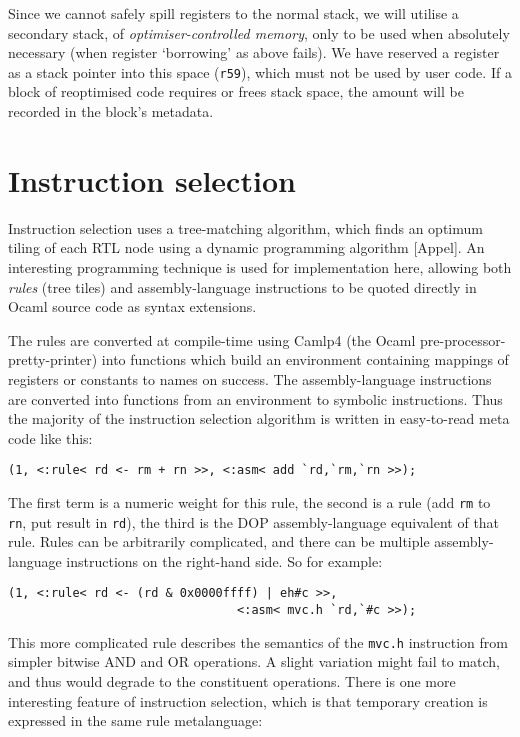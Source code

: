 Since we cannot safely spill registers to the normal stack, we will utilise a secondary stack, of \emph{optimiser-controlled memory}, only to be used when absolutely necessary (when register `borrowing' as above fails). We have reserved a register as a stack pointer into this space (\texttt{r59}), which must not be used by user code. If a block of reoptimised code requires or frees stack space, the amount will be recorded in the block's metadata.

\section{Instruction selection}

Instruction selection uses a tree-matching algorithm, which finds an optimum tiling of each RTL node using a dynamic programming algorithm [Appel]. An interesting programming technique is used for implementation here, allowing both \emph{rules} (tree tiles) and assembly-language instructions to be quoted directly in Ocaml source code as syntax extensions.

The rules are converted at compile-time using Camlp4 (the Ocaml pre-processor-pretty-printer) into functions which build an environment containing mappings of registers or constants to names on success. The assembly-language instructions are converted into functions from an environment to symbolic instructions. Thus the majority of the instruction selection algorithm is written in easy-to-read meta code like this:

\begin{verbatim}
(1, <:rule< rd <- rm + rn >>, <:asm< add `rd,`rm,`rn >>);
\end{verbatim}

The first term is a numeric weight for this rule, the second is a rule (add \texttt{rm} to \texttt{rn}, put result in \texttt{rd}), the third is the DOP assembly-language equivalent of that rule. Rules can be arbitrarily complicated, and there can be multiple assembly-language instructions on the right-hand side. So for example:

\begin{verbatim}
(1, <:rule< rd <- (rd & 0x0000ffff) | eh#c >>,
                                <:asm< mvc.h `rd,`#c >>);
\end{verbatim}

This more complicated rule describes the semantics of the \texttt{mvc.h} instruction from simpler bitwise AND and OR operations. A slight variation might fail to match, and thus would degrade to the constituent operations. There is one more interesting feature of instruction selection, which is that temporary creation is expressed in the same rule metalanguage:

